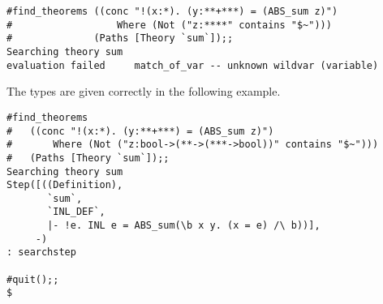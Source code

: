 \begin{session}\begin{verbatim}
#find_theorems ((conc "!(x:*). (y:**+***) = (ABS_sum z)")
#                  Where (Not ("z:****" contains "$~")))
#              (Paths [Theory `sum`]);;
Searching theory sum
evaluation failed     match_of_var -- unknown wildvar (variable)
\end{verbatim}\end{session}

\noindent
The types are given correctly in the following example.

\begin{session}\begin{verbatim}
#find_theorems
#   ((conc "!(x:*). (y:**+***) = (ABS_sum z)")
#       Where (Not ("z:bool->(**->(***->bool))" contains "$~")))
#   (Paths [Theory `sum`]);;
Searching theory sum
Step([((Definition),
       `sum`,
       `INL_DEF`,
       |- !e. INL e = ABS_sum(\b x y. (x = e) /\ b))],
     -)
: searchstep

#quit();;
$
\end{verbatim}\end{session}

